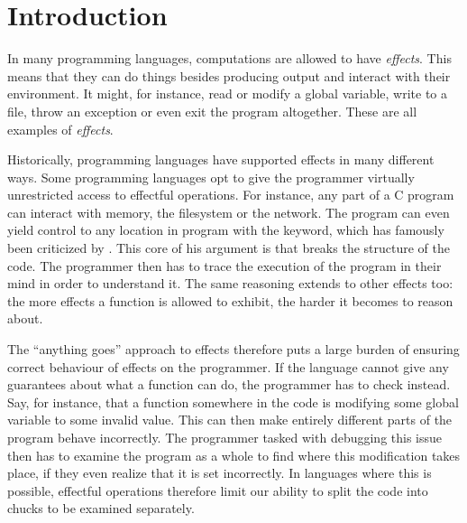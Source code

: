 \chapter{Introduction}\label{chap:introduction}



In many programming languages, computations are allowed to have \emph{effects}. This means that they can do things besides producing output and interact with their environment. It might, for instance, read or modify a global variable, write to a file, throw an exception or even exit the program altogether. These are all examples of \emph{effects}.

Historically, programming languages have supported effects in many different ways. Some programming languages opt to give the programmer virtually unrestricted access to effectful operations. For instance, any part of a C program can interact with memory, the filesystem or the network. The program can even yield control to any location in program with the  keyword, which has famously been criticized by \textcite{dijkstra_letters_1968}. This core of his argument is that  breaks the structure of the code. The programmer then has to trace the execution of the program in their mind in order to understand it. The same reasoning extends to other effects too: the more effects a function is allowed to exhibit, the harder it becomes to reason about.

The ``anything goes'' approach to effects therefore puts a large burden of ensuring correct behaviour of effects on the programmer. If the language cannot give any guarantees about what a function can do, the programmer has to check instead. Say, for instance, that a function somewhere in the code is modifying some global variable to some invalid value. This can then make entirely different parts of the program behave incorrectly. The programmer tasked with debugging this issue then has to examine the program as a whole to find where this modification takes place, if they even realize that it is set incorrectly. In languages where this is possible, effectful operations therefore limit our ability to split the code into chucks to be examined separately.

